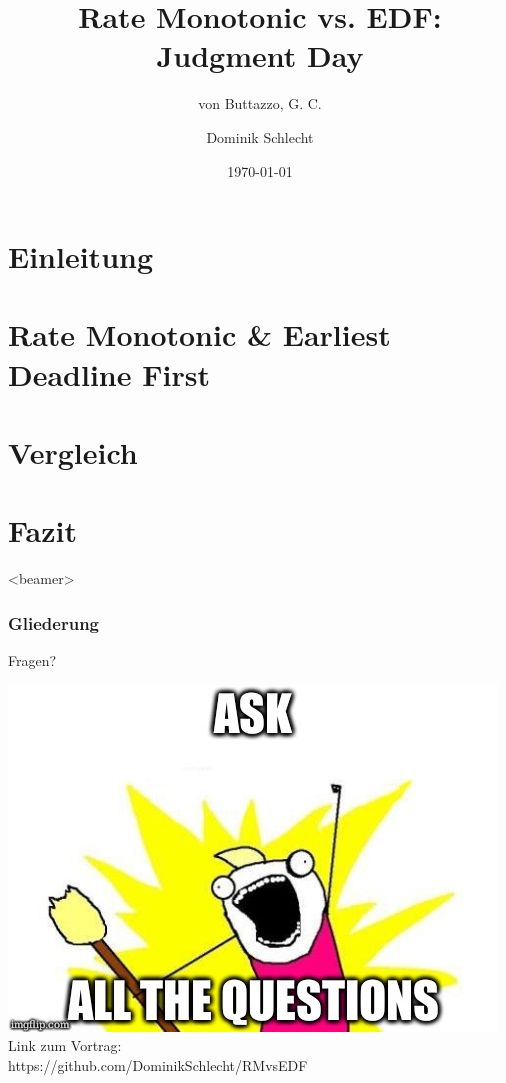\documentclass[unknownkeysallowed]{beamer}
\title{Rate Monotonic vs. EDF: Judgment Day}
\subtitle{von Buttazzo, G. C.}
\date{\today}
\author{Dominik Schlecht}
\institute[THI]{Technische Hochschule Ingolstadt}
\newcounter{ct}
\begin{document}
	\frame{\maketitle}
	\frame{\tableofcontents[hideallsubsections]}
	
	
	\section{Einleitung}
	
	
	\section{Rate Monotonic \& Earliest Deadline First}
	
	
	\section{Vergleich}
	
	
	
	\section{Fazit}

	\begin{frame}<beamer>
		\frametitle{Gliederung}
		\tableofcontents[
  			currentsection,
  			sectionstyle=show/show,
  			subsectionstyle=show/shaded/hide,
  			squeeze
		]
	\end{frame}	
	
	
	
\begin{frame}{Fragen?}
	\begin{center}
			\includegraphics[scale=.4]{graphics/memes/ask.jpg}\\[2ex]
			Link zum Vortrag:\\https://github.com/DominikSchlecht/RMvsEDF
	\end{center}
\end{frame}
	
\end{document}
